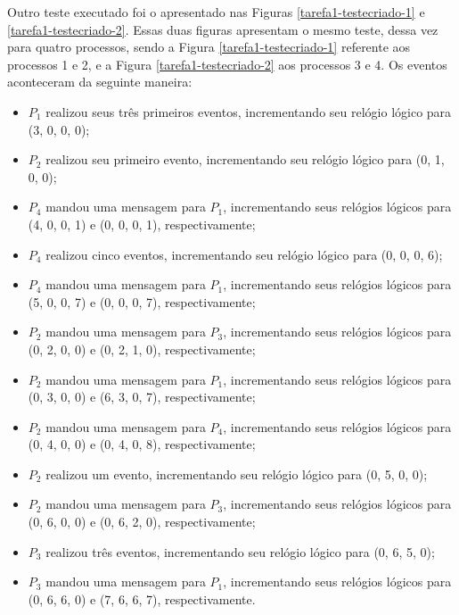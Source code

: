 \documentclass[conference]{IEEEtran}
\begin{document}
	Outro teste executado foi o apresentado nas Figuras \ref{tarefa1-testecriado-1} e \ref{tarefa1-testecriado-2}. Essas duas figuras apresentam o mesmo teste, dessa vez para quatro processos, sendo a Figura \ref{tarefa1-testecriado-1} referente aos processos 1 e 2, e a Figura \ref{tarefa1-testecriado-2} aos processos 3 e 4. Os eventos aconteceram da seguinte maneira:
	
\begin{itemize}
\item $P_1$ realizou seus três primeiros eventos, incrementando seu relógio lógico para (3, 0, 0, 0);
\item $P_2$ realizou seu primeiro evento, incrementando seu relógio lógico para (0, 1, 0, 0);
\item $P_4$ mandou uma mensagem para $P_1$, incrementando seus relógios lógicos para (4, 0, 0, 1) e (0, 0, 0, 1), respectivamente;
\item $P_4$ realizou cinco eventos, incrementando seu relógio lógico para (0, 0, 0, 6);
\item $P_4$ mandou uma mensagem para $P_1$, incrementando seus relógios lógicos para (5, 0, 0, 7) e (0, 0, 0, 7), respectivamente;
\item $P_2$ mandou uma mensagem para $P_3$, incrementando seus relógios lógicos para (0, 2, 0, 0) e (0, 2, 1, 0), respectivamente;
\item $P_2$ mandou uma mensagem para $P_1$, incrementando seus relógios lógicos para (0, 3, 0, 0) e (6, 3, 0, 7), respectivamente;
\item $P_2$ mandou uma mensagem para $P_4$, incrementando seus relógios lógicos para (0, 4, 0, 0) e (0, 4, 0, 8), respectivamente;
\item $P_2$ realizou um evento, incrementando seu relógio lógico para (0, 5, 0, 0);
\item $P_2$ mandou uma mensagem para $P_3$, incrementando seus relógios lógicos para (0, 6, 0, 0) e (0, 6, 2, 0), respectivamente;
\item $P_3$ realizou três eventos, incrementando seu relógio lógico para (0, 6, 5, 0);
\item $P_3$ mandou uma mensagem para $P_1$, incrementando seus relógios lógicos para (0, 6, 6, 0) e (7, 6, 6, 7), respectivamente.
\end{itemize}
\end{document}

